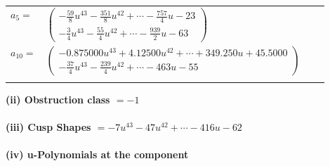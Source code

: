 \documentclass[1p]{elsarticle_modified}
\theoremstyle{definition}
\begin{document}
\begin{tabular}{m{7pt} m{180pt} m{7pt} m{180pt} }
\flushright $a_{5}=$&$\begin{pmatrix}-\frac{59}{8} u^{43}-\frac{351}{8} u^{42}+\cdots-\frac{757}{4} u-23\\-\frac{3}{4} u^{43}-\frac{55}{4} u^{42}+\cdots-\frac{939}{2} u-63\end{pmatrix}$ \\
\flushright $a_{10}=$&$\begin{pmatrix}-0.875000 u^{43}+4.12500 u^{42}+\cdots+349.250 u+45.5000\\-\frac{37}{4} u^{43}-\frac{239}{4} u^{42}+\cdots-463 u-55\end{pmatrix}$\\&\end{tabular}
\flushleft \textbf{(ii) Obstruction class $= -1$}\\~\\
\flushleft \textbf{(iii) Cusp Shapes $= -7 u^{43}-47 u^{42}+\cdots-416 u-62$}\\~\\
\newpage\renewcommand{\arraystretch}{1}
\flushleft \textbf{(iv) u-Polynomials at the component}\newline \\
\end{document}
